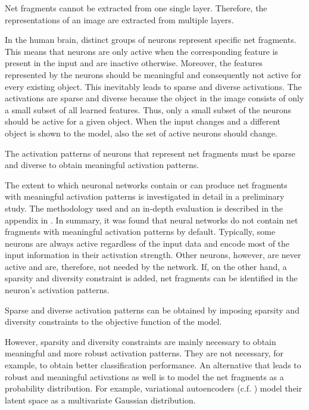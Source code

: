 \begin{implementation}
	Net fragments cannot be extracted from one single layer. Therefore, the representations of an image are extracted from multiple layers.
\end{implementation}

In the human brain, distinct groups of neurons represent specific net fragments.
This means that neurons are only active when the corresponding feature is present in the input and are inactive otherwise.
Moreover, the features represented by the neurons should be meaningful and consequently not active for every existing object.
This inevitably leads to sparse and diverse activations.
The activations are sparse and diverse because the object in the image consists of only a small subset of all learned features. Thus, only a small subset of the neurons should be active for a given object.
When the input changes and a different object is shown to the model, also the set of active neurons should change.

\begin{claim}
	The activation patterns of neurons that represent net fragments must be sparse and diverse to obtain meaningful activation patterns.
\end{claim}

The extent to which neuronal networks contain or can produce net fragments with meaningful activation patterns is investigated in detail in a preliminary study.
The methodology used and an in-depth evaluation is described in the appendix in .
In summary, it was found that neural networks do not contain net fragments with meaningful activation patterns by default. Typically, some neurons are always active regardless of the input data and encode most of the input information in their activation strength.
Other neurons, however, are never active and are, therefore, not needed by the network.
If, on the other hand, a sparsity and diversity constraint is added, net fragments can be identified in the neuron's activation patterns.

\begin{implementation}
	Sparse and diverse activation patterns can be obtained by imposing sparsity and diversity constraints to the objective function of the model.
\end{implementation}

However, sparsity and diversity constraints are mainly necessary to obtain meaningful and more robust activation patterns.
They are not necessary, for example,  to obtain better classification performance.
An alternative that leads to robust and meaningful activations as well is to model the net fragments as a probability distribution.
For example, variational autoencoders (c.f. ) model their latent space as a multivariate Gaussian distribution.


